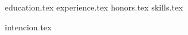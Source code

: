 \documentclass[11pt, a4paper]{awesome-cv}
\newcommand*{\sectiondir}{resume/}
\begin{document}
\makecvheader

{education.tex}
{experience.tex}
{honors.tex}
{skills.tex}

\newpage
{intencion.tex}
\end{document}
